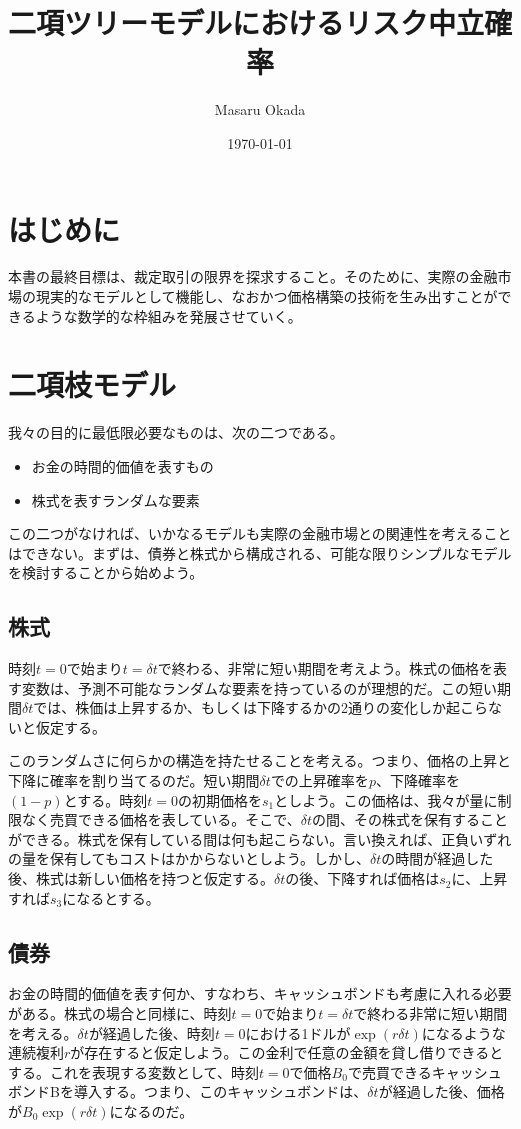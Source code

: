 \documentclass[uplatex,a4j,12pt,dvipdfmx]{jsarticle}
\title{
二項ツリーモデルにおけるリスク中立確率
}
\author{Masaru Okada}
\date{\today}
\begin{document}
\maketitle

\tableofcontents

\newpage

\section{はじめに}
本書の最終目標は、裁定取引の限界を探求すること。そのために、実際の金融市場の現実的なモデルとして機能し、なおかつ価格構築の技術を生み出すことができるような数学的な枠組みを発展させていく。

\section{二項枝モデル}
我々の目的に最低限必要なものは、次の二つである。
\begin{itemize}
	\item お金の時間的価値を表すもの
	\item 株式を表すランダムな要素
\end{itemize}
この二つがなければ、いかなるモデルも実際の金融市場との関連性を考えることはできない。まずは、債券と株式から構成される、可能な限りシンプルなモデルを検討することから始めよう。

\subsection{株式}
時刻$t=0$で始まり$t=\delta t$で終わる、非常に短い期間を考えよう。株式の価格を表す変数は、予測不可能なランダムな要素を持っているのが理想的だ。この短い期間$\delta t$では、株価は上昇するか、もしくは下降するかの2通りの変化しか起こらないと仮定する。

このランダムさに何らかの構造を持たせることを考える。つまり、価格の上昇と下降に確率を割り当てるのだ。短い期間$\delta t$での上昇確率を$p$、下降確率を$(1-p)$とする。時刻$t=0$の初期価格を$s_1$としよう。この価格は、我々が量に制限なく売買できる価格を表している。そこで、$\delta t$の間、その株式を保有することができる。株式を保有している間は何も起こらない。言い換えれば、正負いずれの量を保有してもコストはかからないとしよう。しかし、$\delta t$の時間が経過した後、株式は新しい価格を持つと仮定する。$\delta t$の後、下降すれば価格は$s_2$に、上昇すれば$s_3$になるとする。

\subsection{債券}
お金の時間的価値を表す何か、すなわち、キャッシュボンドも考慮に入れる必要がある。株式の場合と同様に、時刻$t=0$で始まり$t=\delta t$で終わる非常に短い期間を考える。$\delta t$が経過した後、時刻$t=0$における1ドルが$\exp(r\delta t)$になるような連続複利$r$が存在すると仮定しよう。この金利で任意の金額を貸し借りできるとする。これを表現する変数として、時刻$t=0$で価格$B_0$で売買できるキャッシュボンドBを導入する。つまり、このキャッシュボンドは、$\delta t$が経過した後、価格が$B_0 \exp(r\delta t)$になるのだ。
\end{document}
